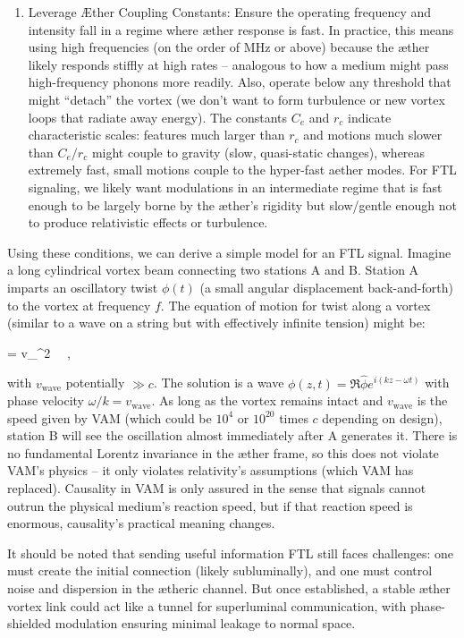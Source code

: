 \begin{enumerate}
\item 
Leverage Æther Coupling Constants: Ensure the operating frequency and intensity fall in a regime where æther response is fast. In practice, this means using high frequencies (on the order of MHz or above) because the æther likely responds stiffly at high rates – analogous to how a medium might pass high-frequency phonons more readily. Also, operate below any threshold that might “detach” the vortex (we don’t want to form turbulence or new vortex loops that radiate away energy). The constants $C_e$ and $r_c$ indicate characteristic scales: features much larger than $r_c$ and motions much slower than $C_e/r_c$ might couple to gravity (slow, quasi-static changes), whereas extremely fast, small motions couple to the hyper-fast aether modes. For FTL signaling, we likely want modulations in an intermediate regime that is fast enough to be largely borne by the æther’s rigidity but slow/gentle enough not to produce relativistic effects or turbulence.




\end{enumerate}

Using these conditions, we can derive a simple model for an FTL signal. Imagine a long cylindrical vortex beam connecting two stations A and B. Station A imparts an oscillatory twist $\phi(t)$ (a small angular displacement back-and-forth) to the vortex at frequency $f$. The equation of motion for twist along a vortex (similar to a wave on a string but with effectively infinite tension) might be:


  = v_{}^2 \, ~, 


with $v_{\text{wave}}$ potentially $\gg c$. The solution is a wave $\phi(z,t) = \Re{\hat{\phi} e^{i(kz - \omega t)}}$ with phase velocity $\omega/k = v_{\text{wave}}$. As long as the vortex remains intact and $v_{\text{wave}}$ is the speed given by VAM (which could be $10^4$ or $10^{20}$ times $c$ depending on design), station B will see the oscillation almost immediately after A generates it. There is no fundamental Lorentz invariance in the æther frame, so this does not violate VAM’s physics – it only violates relativity’s assumptions (which VAM has replaced). Causality in VAM is only assured in the sense that signals cannot outrun the physical medium’s reaction speed, but if that reaction speed is enormous, causality’s practical meaning changes.


It should be noted that sending useful information FTL still faces challenges: one must create the initial connection (likely subluminally), and one must control noise and dispersion in the ætheric channel. But once established, a stable æther vortex link could act like a tunnel for superluminal communication, with phase-shielded modulation ensuring minimal leakage to normal space.


